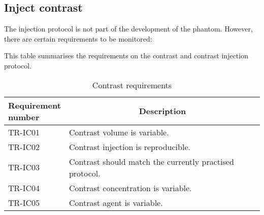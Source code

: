 \subsection{Inject contrast}
The injection protocol is not part of the development of the phantom. However, there are certain requirements to be monitored:
\begin{table} [H]
\caption{Contrast requirements}
\label{tab:injcon}
This table summarises the requirements on the contrast and contrast injection protocol.
\begin{tabular}{l|p{120mm}|}
	\makecell[l]{\textbf{Requirement} \\ \textbf{number}} & \multicolumn{1}{c}{\textbf{Description}}\\
	\hline
	TR-IC01 & Contrast volume is variable. \\
	TR-IC02 & Contrast injection is reproducible. \\
	TR-IC03 & Contrast should match the currently practised protocol. \\
	TR-IC04 & Contrast concentration is variable. \\
	TR-IC05 & Contrast agent is variable. \\
	\cline{2-2}
\end{tabular}
\end{table}

